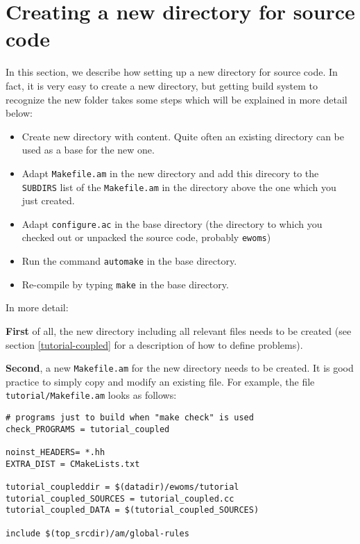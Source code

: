 \chapter{Creating a new directory for source code}

In this section, we describe how setting up a new directory for source
code. In fact, it is very easy to create a new directory, but getting
\Dune build system to recognize the new folder takes some steps which
will be explained in more detail below:

\begin{itemize}
\item Create new directory with content. Quite often an existing
  directory can be used as a base for the new one.
\item Adapt \texttt{Makefile.am} in the new directory and add this
  direcory to the \texttt{SUBDIRS} list of the \texttt{Makefile.am} in
  the directory above the one which you just created.
\item Adapt \texttt{configure.ac} in the \eWoms base directory (the
  directory to which you checked out or unpacked the \eWoms source
  code, probably \texttt{ewoms})
\item Run the command \texttt{automake} in the \eWoms base directory.
\item Re-compile \eWoms by typing \texttt{make} in the \eWoms base
  directory.
\end{itemize}

\noindent In more detail:

\textbf{First} of all, the new directory including all relevant files
needs to be created (see section \ref{tutorial-coupled} for a
description of how to define problems).

\textbf{Second}, a new \texttt{Makefile.am} for the new directory
needs to be created. It is good practice to simply copy and modify an
existing file. For example, the file \texttt{tutorial/Makefile.am}
looks as follows:
\begin{verbatim}
# programs just to build when "make check" is used
check_PROGRAMS = tutorial_coupled

noinst_HEADERS= *.hh
EXTRA_DIST = CMakeLists.txt

tutorial_coupleddir = $(datadir)/ewoms/tutorial
tutorial_coupled_SOURCES = tutorial_coupled.cc
tutorial_coupled_DATA = $(tutorial_coupled_SOURCES)

include $(top_srcdir)/am/global-rules
\end{verbatim}

